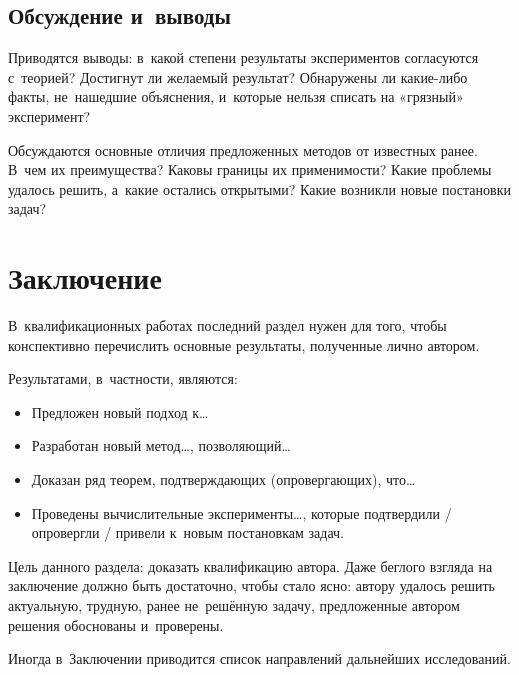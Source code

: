 \documentclass[12pt, fleqn]{article}
\begin{document}
\subsection{Обсуждение и~выводы}
Приводятся выводы: 
в~какой степени результаты экспериментов согласуются с~теорией? 
Достигнут ли желаемый результат? 
Обнаружены ли какие-либо факты, не~нашедшие объяснения, и~которые нельзя списать на «грязный» эксперимент?

Обсуждаются основные отличия предложенных методов от известных ранее. 
В~чем их преимущества? 
Каковы границы их применимости? 
Какие проблемы удалось решить, а~какие остались открытыми? 
Какие возникли новые постановки задач?

\section{Заключение}

В~квалификационных работах последний раздел нужен для того, чтобы 
конспективно перечислить основные результаты, полученные лично автором. 

Результатами, в~частности, являются:
\begin{itemize}
\item 
    Предложен новый подход к\dots
\item 
    Разработан новый метод\dots, позволяющий\dots
\item 
    Доказан ряд теорем, подтверждающих (опровергающих), что\dots
\item 
    Проведены вычислительные эксперименты\dots,
    которые подтвердили / опровергли / привели к~новым постановкам задач.
\end{itemize}
    
Цель данного раздела: доказать квалификацию автора. 
Даже беглого взгляда на заключение должно быть достаточно, чтобы стало ясно: 
автору удалось решить актуальную, трудную, ранее не~решённую задачу, 
предложенные автором решения обоснованы и~проверены.

Иногда в~Заключении приводится список направлений дальнейших исследований.

\newpage

\renewcommand{\bibname}{Список литературы}
\addcontentsline{toc}{section}{\bibname}

\nocite{OptimalConvexCorrectingProcedures, ConvexCombinationsBestCorrelatedWithResponse}

\def\BibUrl#1.{}\def\BibAnnote#1.{}


\end{document}
